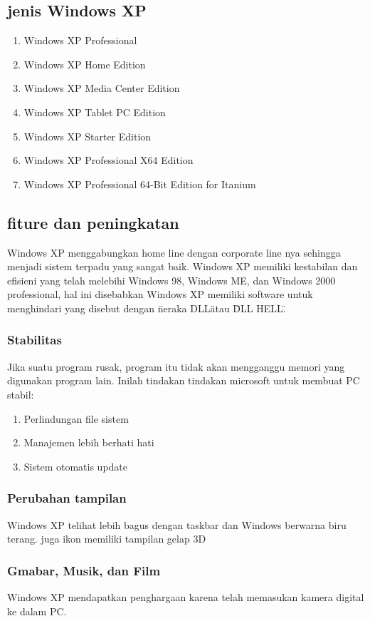 		\subsection{jenis Windows XP}
\begin{enumerate}
			\item Windows XP Professional
			\item Windows XP Home Edition
			\item Windows XP Media Center Edition
			\item Windows XP Tablet PC Edition
			\item Windows XP Starter Edition
			\item Windows XP Professional X64 Edition
			\item Windows XP Professional 64-Bit Edition for Itanium
\end{enumerate}
		\subsection{fiture dan peningkatan}
			Windows XP menggabungkan home line dengan corporate line nya sehingga menjadi sistem terpadu yang sangat baik. Windows XP memiliki kestabilan dan efisieni yang telah melebihi Windows 98, Windows ME, dan Windows 2000 professional, hal ini disebabkan Windows XP memiliki software untuk menghindari yang disebut dengan \"neraka DLL\" atau \"DLL HELL\".
			\subsubsection{Stabilitas}
				Jika suatu program rusak, program itu tidak akan mengganggu memori yang digunakan program lain. Inilah tindakan tindakan microsoft untuk membuat PC stabil:
\begin{enumerate}
		 			\item Perlindungan file sistem
		 			\item Manajemen lebih berhati hati
		 			\item Sistem otomatis update
\end{enumerate}
			\subsubsection{Perubahan tampilan}
				Windows XP telihat lebih bagus dengan taskbar dan Windows berwarna biru terang. juga ikon memiliki tampilan gelap 3D
			\subsubsection{Gmabar, Musik, dan Film}
				Windows XP mendapatkan penghargaan karena telah memasukan kamera digital ke dalam PC.
